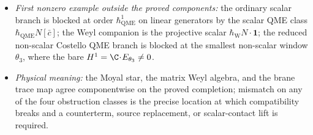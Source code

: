 \documentclass[11pt]{memoir}
\begin{document}
\begin{thm}
\begin{itemize}
      holds on the verified Hamiltonian windows of
      Proposition~\ref{prop:app-edge-pbw-telescoping},
      Proposition~\ref{prop:app-radial-pr-unconditional-window},
      and Proposition~\ref{prop:app-free-residual-vanishings}, as
      assembled in Theorem~\ref{thm:phi-hbar-all-order}; outside those
      windows it is the radial obstruction class
      \(\Omega^{\mathrm{rad}}_{a,b}\).
    \item \emph{First nonzero example outside the proved components:}
      the ordinary scalar branch is blocked at order
      \(\hbar_{\mathrm{QME}}^1\) on linear generators by the scalar
      QME class \(\hbar_{\mathrm{QME}}N[\bar c]\); the Weyl companion
      is the projective scalar
      \(\hbar_{\mathrm{W}}N\cdot\mathbf 1\); the
      reduced non-scalar Costello QME branch is blocked at the
      smallest non-scalar window
      \(\theta_3\), where the bare \(H^1=\C\!\cdot\!E_{\theta_3}\ne0\).
    \item \emph{Physical meaning:} the Moyal star, the matrix Weyl
      algebra, and the brane trace map agree
      componentwise on the proved completion; mismatch on any of the
      four obstruction classes is the precise location at which
      compatibility breaks and a counterterm, source replacement, or
      scalar-contact lift is required.
  \end{itemize}


\end{thm}
\end{document}
